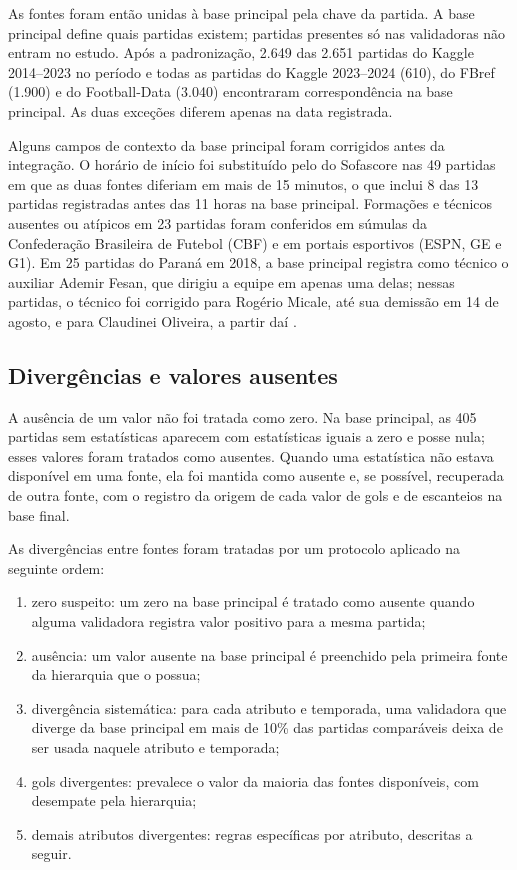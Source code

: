 As fontes foram então unidas à base principal pela chave da partida. A base principal define quais partidas existem; partidas presentes só nas validadoras não entram no estudo. Após a padronização, 2.649 das 2.651 partidas do Kaggle 2014--2023 no período e todas as partidas do Kaggle 2023--2024 (610), do FBref (1.900) e do Football-Data (3.040) encontraram correspondência na base principal. As duas exceções diferem apenas na data registrada.

Alguns campos de contexto da base principal foram corrigidos antes da integração. O horário de início foi substituído pelo do Sofascore nas 49 partidas em que as duas fontes diferiam em mais de 15 minutos, o que inclui 8 das 13 partidas registradas antes das 11 horas na base principal. Formações e técnicos ausentes ou atípicos em 23 partidas foram conferidos em súmulas da Confederação Brasileira de Futebol (CBF) e em portais esportivos (ESPN, GE e G1). Em 25 partidas do Paraná em 2018, a base principal registra como técnico o auxiliar Ademir Fesan, que dirigiu a equipe em apenas uma delas; nessas partidas, o técnico foi corrigido para Rogério Micale, até sua demissão em 14 de agosto, e para Claudinei Oliveira, a partir daí \cite{tribunaMicale2018,tribunaClaudinei2018}.

\subsection{Divergências e valores ausentes}\label{subsec:Conflitos}

A ausência de um valor não foi tratada como zero. Na base principal, as 405 partidas sem estatísticas aparecem com estatísticas iguais a zero e posse nula; esses valores foram tratados como ausentes. Quando uma estatística não estava disponível em uma fonte, ela foi mantida como ausente e, se possível, recuperada de outra fonte, com o registro da origem de cada valor de gols e de escanteios na base final.

As divergências entre fontes foram tratadas por um protocolo aplicado na seguinte ordem:
\begin{enumerate}
  \item zero suspeito: um zero na base principal é tratado como ausente quando alguma validadora registra valor positivo para a mesma partida;
  \item ausência: um valor ausente na base principal é preenchido pela primeira fonte da hierarquia que o possua;
  \item divergência sistemática: para cada atributo e temporada, uma validadora que diverge da base principal em mais de 10\% das partidas comparáveis deixa de ser usada naquele atributo e temporada;
  \item gols divergentes: prevalece o valor da maioria das fontes disponíveis, com desempate pela hierarquia;
  \item demais atributos divergentes: regras específicas por atributo, descritas a seguir.
\end{enumerate}

